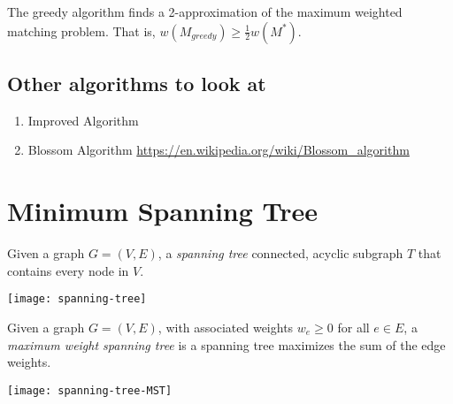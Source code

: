 \documentclass[../open-optimization/open-optimization.tex]{subfiles}
\begin{document}
\begin{theorem}
The greedy algorithm finds a 2-approximation of the maximum weighted matching problem.  That is, $w(M_{greedy}) \geq \tfrac{1}{2} w(M^*)$.
\end{theorem}


\subsection{Other algorithms to look at}
\begin{enumerate}
\item Improved  Algorithm \cite{DRAKE2003211}
\item Blossom Algorithm \url{https://en.wikipedia.org/wiki/Blossom_algorithm}
\end{enumerate}



\section{Minimum Spanning Tree}
\begin{definition}
Given a graph $G = (V,E)$, a \emph{spanning tree} connected, acyclic subgraph $T$ that contains every node in $V$.
\end{definition}

\begin{center}
\texttt{[image: spanning-tree]}
\end{center}

\begin{definition}
Given a graph $G = (V,E)$, with associated weights $w_e\geq 0$ for all $e \in E$, a \emph{maximum weight spanning tree} is a spanning tree maximizes the sum of the edge weights.
\end{definition}

\begin{center}
\texttt{[image: spanning-tree-MST]}
\end{center}
\end{document}
